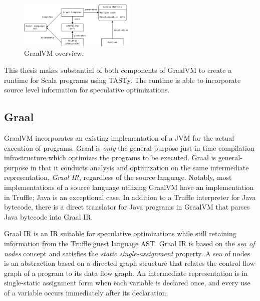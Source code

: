 \begin{figure}[!htb]
	\centering
	\includegraphics[width=0.5\textwidth]{figures/graalvm-pipeline.png}
	\caption{GraalVM overview\cite{graalvm:ir}.}
\end{figure}

This thesis makes substantial of both components of GraalVM to create a runtime for Scala programs using TASTy.
The runtime is able to incorporate source level information for speculative optimizations.

\subsection{Graal}

GraalVM incorporates an existing implementation of a JVM\cite{java:hotspot} for the actual execution of programs.
Graal is \textit{only} the general-purpose just-in-time compilation infrastructure which optimizes the programs to be executed.
Graal is general-purpose in that it conducts analysis and optimization on the same intermediate representation, \textit{Graal IR}, regardless of the source language.
Notably, most implementations of a source language utilizing GraalVM have an implementation in Truffle; Java is an exceptional case.
In addition to a Truffle interpreter for Java bytecode\cite{graalvm:espresso}, there is a direct translator for Java programs in GraalVM that parses Java bytecode into Graal IR.

Graal IR\cite{graalvm:ir} is an IR suitable for speculative optimizations while still retaining information from the Truffle guest language AST.
Graal IR is based on the \textit{sea of nodes} concept\cite{click:sea-of-nodes} and satisfies the \textit{static single-assignment}\cite{ssa} property.
A sea of nodes is an abstraction based on a directed graph structure that relates the control flow graph\cite{allen:ctrl-flow-analysis} of a program to its data flow graph\cite{allen:data-flow-analysis}.
An intermediate representation is in single-static assignment form when each variable is declared once, and every use of a variable occurs immediately after its declaration\cite{johnson:use-def-chains}.

